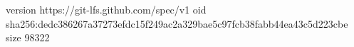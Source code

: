 version https://git-lfs.github.com/spec/v1
oid sha256:dedc386267a37273efdc15f249ac2a329bae5c97fcb38fabb44ea43c5d223cbe
size 98322
